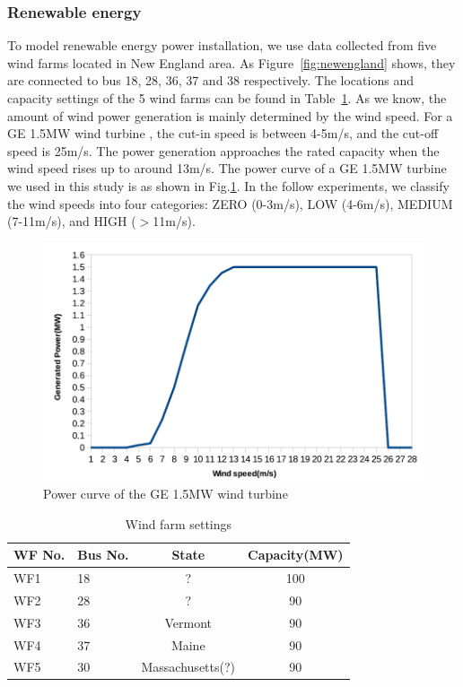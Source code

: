 \subsubsection{Renewable energy}
To model renewable energy power installation, we use data collected from five wind farms located in New England area.  As Figure~\ref{fig:newengland} shows, they are connected to bus 18, 28, 36, 37 and 38 respectively. The locations and capacity settings of the 5 wind farms can be found in Table~\ref{tab:wf_setting}. As we know, the amount of wind power generation is mainly determined by the wind speed. For a GE 1.5MW wind turbine \cite{lei2006modeling}, the cut-in speed is between 4-5m/s, and the cut-off speed is 25m/s. The power generation approaches the rated capacity when the wind speed rises up to around 13m/s. The power curve of a GE 1.5MW turbine we used in this study is as shown in Fig.\ref{fig:windcurve}. In the follow experiments, we classify the wind speeds into four categories: ZERO (0-3m/s), LOW (4-6m/s), MEDIUM (7-11m/s), and HIGH ($>$11m/s). 

\begin{figure}[ht]
\centering
\includegraphics[width=1\columnwidth]{img/wind_curve.pdf}
\caption{Power curve of the GE 1.5MW wind turbine}
\label{fig:windcurve}
\end{figure}


\begin{table}[ht]
\begin{center}
\caption{Wind farm settings}
\begin{tabular}{|l|l|c|c|}
\hline
WF No. & Bus No. & State & Capacity(MW) \\
\hline
WF1 & 18& ? & 100\\
WF2 & 28& ? & 90 \\
WF3 & 36& Vermont & 90  \\
WF4 & 37& Maine & 90\\
WF5 & 30& Massachusetts(?) & 90\\
\hline

\end{tabular}
   \vspace{.05in}
\label{tab:wf_setting}
\end{center}
\end{table}


